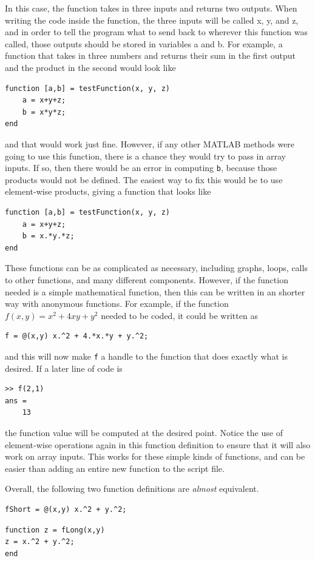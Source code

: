 \documentclass{ximera}
\begin{document}
In this case, the function takes in three inputs and returns two outputs. When writing the code inside the function, the three inputs will be called x, y, and z, and in order to tell the program what to send back to wherever this function was called, those outputs should be stored in variables a and b. For example, a function that takes in three numbers and returns their sum in the first output and the product in the second would look like
\begin{verbatim}
function [a,b] = testFunction(x, y, z)
    a = x+y+z;
    b = x*y*z;
end
\end{verbatim}
and that would work just fine. However, if any other MATLAB methods were going to use this function, there is a chance they would try to pass in array inputs. If so, then there would be an error in computing \texttt{b}, because those products would not be defined. The easiest way to fix this would be to use element-wise products, giving a function that looks like  
\begin{verbatim}
function [a,b] = testFunction(x, y, z)
    a = x+y+z;
    b = x.*y.*z;
end
\end{verbatim}

These functions can be as complicated as necessary, including graphs, loops, calls to other functions, and many different components. However, if the function needed is a simple mathematical function, then this can be written in an shorter way with anonymous functions. For example, if the function $f(x,y) = x^2 + 4xy + y^2$ needed to be coded, it could be written as
\begin{verbatim}
f = @(x,y) x.^2 + 4.*x.*y + y.^2;
\end{verbatim}
and this will now make \texttt{f} a handle to the function that does exactly what is desired. If a later line of code is
\begin{verbatim}
>> f(2,1)
ans = 
    13
\end{verbatim}
the function value will be computed at the desired point. Notice the use of element-wise operations again in this function definition to ensure that it will also work on array inputs. This works for these simple kinds of functions, and can be easier than adding an entire new function to the script file.

Overall, the following two function definitions are \emph{almost} equivalent.
\begin{verbatim}
fShort = @(x,y) x.^2 + y.^2;
\end{verbatim}
\begin{verbatim}
function z = fLong(x,y)
z = x.^2 + y.^2;
end
\end{verbatim}
\end{document}
